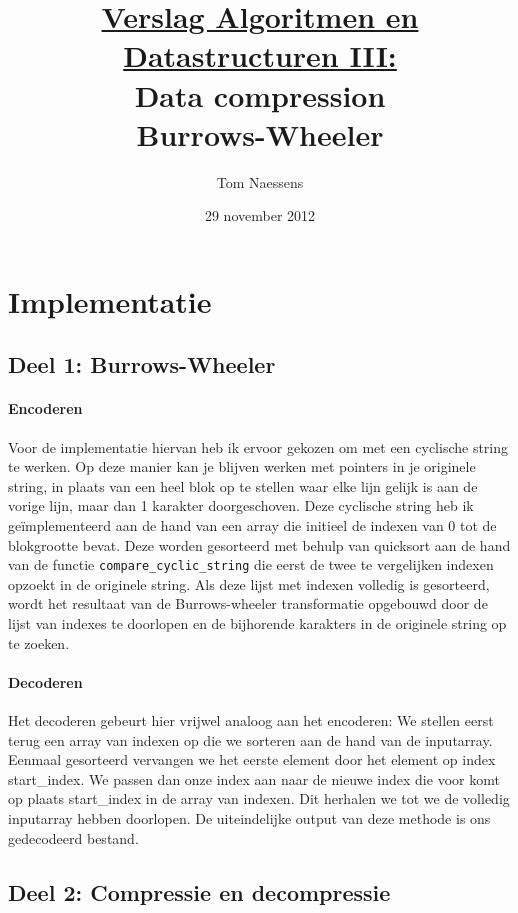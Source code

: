 \documentclass[11pt,a4paper]{article}
\author{Tom Naessens}
\title{\underline{Verslag Algoritmen en Datastructuren III:}\\ Data compression\\ Burrows-Wheeler }
\date {29 november 2012}
\begin{document}
\maketitle
\newpage

\section{Implementatie}
\subsection{Deel 1: Burrows-Wheeler}

\paragraph*{Encoderen}
Voor de implementatie hiervan heb ik ervoor gekozen om met een cyclische string te werken. Op deze manier kan je blijven werken met pointers in je originele string, in plaats van een heel blok op te stellen waar elke lijn gelijk is aan de vorige lijn, maar dan 1 karakter doorgeschoven. Deze cyclische string heb ik ge\"implementeerd aan de hand van een array die initieel de indexen van 0 tot de blokgrootte bevat. Deze worden gesorteerd met behulp van quicksort aan de hand van de functie \texttt{compare\_cyclic\_string} die eerst de twee te vergelijken indexen opzoekt in de originele string. Als deze lijst met indexen volledig is gesorteerd, wordt het resultaat van de Burrows-wheeler transformatie opgebouwd door de lijst van indexes te doorlopen en de bijhorende karakters in de originele string op te zoeken.\\

\paragraph*{Decoderen}
Het decoderen gebeurt hier vrijwel analoog aan het encoderen:
We stellen eerst terug een array van indexen op die we sorteren aan de hand van de inputarray. Eenmaal gesorteerd vervangen we het eerste element door het element op index start\_index. We passen dan onze index aan naar de nieuwe index die voor komt op plaats start\_index in de array van indexen. Dit herhalen we tot we de volledig inputarray hebben doorlopen. De uiteindelijke output van deze methode is ons gedecodeerd bestand.


\subsection{Deel 2: Compressie en decompressie}
\end{document}
